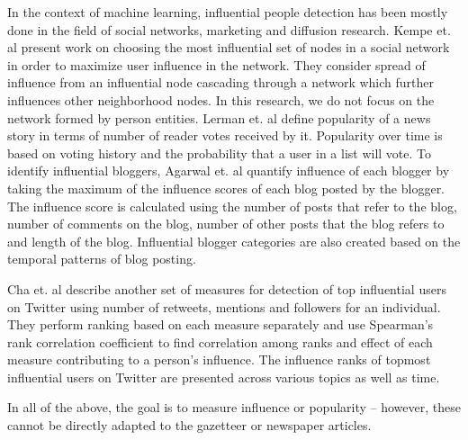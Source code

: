 In the context of machine learning, influential people detection has been mostly done in the field of social networks, marketing and diffusion research.
Kempe et. al \cite{kempe2003maximizing} present work on choosing the most influential set of nodes  in a social network in order to maximize user influence in the network. They consider spread of influence from an influential node cascading through a network which further influences other neighborhood nodes. In this research, we do not focus on the network formed by person entities. Lerman et. al \cite{lerman2010using} define popularity of a news story in terms of number of reader votes received by it. Popularity over time is based on voting history and the probability that a user in a list will vote. To identify influential bloggers, Agarwal et. al\cite{agarwal2008identifying} quantify influence of each blogger by taking the maximum of the influence scores of each blog posted by the blogger. The influence score is calculated using the number of posts that refer to the blog, number of comments on the blog, number of other posts that the blog refers to and length of the blog. Influential blogger categories are also created based on the temporal patterns of blog posting. 

Cha et. al\cite{cha2010measuring} describe another set of measures for detection of top influential users on Twitter using number of retweets, mentions and followers for an individual. They perform ranking based on each measure separately and use Spearman's rank correlation coefficient to find correlation among ranks and effect of each measure contributing to a person's influence. The influence ranks of topmost influential users on Twitter are presented across various topics as well as time.

In all of the above, the goal is to measure influence or popularity -- however, these cannot be directly adapted to the gazetteer or newspaper articles. 